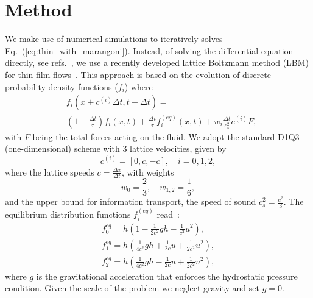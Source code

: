 \documentclass[twocolumn,amsmath,amssymb,showpacs,pre,nofootinbib,superscriptaddress]{revtex4-1} %
\begin{document}
\section{Method}\label{sec:method}
We make use of numerical simulations to iteratively solves Eq.~(\ref{eq:thin_with_marangoni}).
Instead, of solving the differential equation directly, see refs.~\cite{PhysRevE.63.011208, PhysRevLett.119.204501}, we use a recently developed lattice Boltzmann method (LBM) for thin film flows~\cite{PhysRevE.100.033313, PhysRevE.104.034801}.
This approach is based on the evolution of discrete probability density functions ($f_i$) where
\begin{equation}\label{eq:LBE}
    \begin{split}
        &f_i(x+c^{(i)}\Delta t,t+\Delta t) = \\
        &\left(1 - \frac{\Delta t}{\tau}\right) f_i(x,t) + \frac{\Delta t}{\tau} f_i^{(eq)}(x,t) + w_i \frac{\Delta t}{c_s^2} c^{(i)} F,
    \end{split}
\end{equation}
with $F$ being the total forces acting on the fluid.
We adopt the standard D1Q3 (one-dimensional) scheme with $3$ lattice velocities, given by
\begin{equation}\label{eq:speeds}
c^{(i)}  = [0, c, -c], \quad i = 0, 1, 2,
\end{equation}
where the lattice speeds $c=\frac{\Delta x}{\Delta t}$, with weights
\begin{equation}
w_0 = \frac{2}{3},\quad w_{1,2} = \frac{1}{6},
\end{equation}
and the upper bound for information transport, the speed of sound $c_s^2=\frac{c^2}{3}$.
The equilibrium distribution functions $f_i^{(eq)}$ read~\cite{VANTHANG20107373}:
\begin{gather}
    f_{0}^{eq} = h\left(1-\frac{1}{2c^2}gh - \frac{1}{c^2}u^2\right),\nonumber\\
    f_{1}^{eq} = h\left(\frac{1}{4c^2}gh + \frac{1}{2c}u + \frac{1}{2c^2}u^2\right)\label{eq:equilibria},\\
    f_{2}^{eq} = h\left(\frac{1}{4c^2}gh - \frac{1}{2c}u + \frac{1}{2c^2}u^2\right),\nonumber
\end{gather}
where $g$ is the gravitational acceleration that enforces the hydrostatic pressure condition. 
Given the scale of the problem we neglect gravity and set $g=0$.
\end{document}
